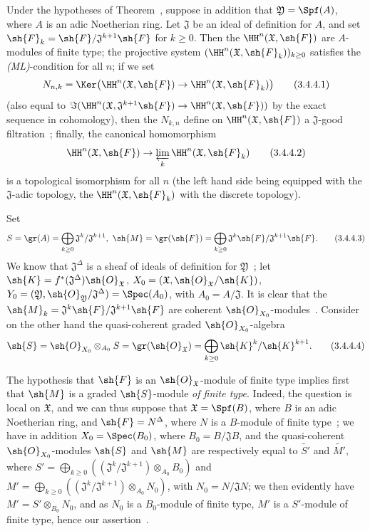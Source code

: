 \begin{corollary}[3.4.4]
\label{III.3.4.4}
Under the hypotheses of Theorem~, suppose in addition that $\mathfrak{Y}=\Spf(A)$, where $A$ is an adic Noetherian ring.
Let $\mathfrak{J}$ be an ideal of definition for $A$, and set $\sh{F}_k=\sh{F}/\mathfrak{J}^{k+1}\sh{F}$ for $k\geq 0$.
Then the $\HH^n(\mathfrak{X},\sh{F})$ are $A$-modules of finite type; the projective system $(\HH^n(\mathfrak{X},\sh{F}_k))_{k\geq 0}$ satisfies the \emph{(ML)}-condition for all $n$; if we set
\[
\label{III.3.4.4.1}
  N_{n,k}=\Ker\big(\HH^n(\mathfrak{X},\sh{F})\to\HH^n(\mathfrak{X},\sh{F}_k)\big)
  \tag{3.4.4.1}
\]
(also equal to $\Im(\HH^n(\mathfrak{X},\mathfrak{J}^{k+1}\sh{F})\to\HH^n(\mathfrak{X},\sh{F}))$ by the exact sequence in cohomology), then the $N_{k,n}$ define on $\HH^n(\mathfrak{X},\sh{F})$ a $\mathfrak{J}$-good filtration~; finally, the canonical homomorphism
\[
\label{III.3.4.4.2}
  \HH^n(\mathfrak{X},\sh{F})\to\varprojlim_k\HH^n(\mathfrak{X},\sh{F}_k)
  \tag{3.4.4.2}
\]
is a topological isomorphism for all $n$ (the left hand side being equipped with the $\mathfrak{J}$-adic topology, the $\HH^n(\mathfrak{X},\sh{F}_k)$ with the discrete topology).
\end{corollary}

Set
\[
\label{III.3.4.4.3}
  S=\gr(A)=\bigoplus_{k\geq 0}\mathfrak{J}^k/\mathfrak{J}^{k+1},\ \sh{M}=\gr(\sh{F})=\bigoplus_{k\geq 0}\mathfrak{J}^k\sh{F}/\mathfrak{J}^{k+1}\sh{F}. \tag{3.4.4.3}
\]
We know that $\mathfrak{J}^\Delta$ is a sheaf of ideals of definition for $\mathfrak{Y}$~; let $\sh{K}=f^*(\mathfrak{J}^\Delta)\sh{O}_\mathfrak{X}$, $X_0=(\mathfrak{X},\sh{O}_\mathfrak{X}/\sh{K})$, $Y_0=(\mathfrak{Y},\sh{O}_\mathfrak{Y}/\mathfrak{J}^\Delta)=\Spec(A_0)$, with $A_0=A/\mathfrak{J}$.
It is clear that the $\sh{M}_k=\mathfrak{J}^k\sh{F}/\mathfrak{J}^{k+1}\sh{F}$ are coherent $\sh{O}_{X_0}$-modules~.
Consider on the other hand the quasi-coherent graded $\sh{O}_{X_0}$-algebra
\[
\label{III.3.4.4.4}
  \sh{S}=\sh{O}_{X_0}\otimes_{A_0}S=\gr(\sh{O}_\mathfrak{X})=\bigoplus_{k\geq 0}\sh{K}^k/\sh{K}^{k+1}.
  \tag{3.4.4.4}
\]

The hypothesis that $\sh{F}$ is an $\sh{O}_\mathfrak{X}$-module of finite type implies first that $\sh{M}$ is
a graded $\sh{S}$-module \emph{of finite type}.
Indeed, the question is local on $\mathfrak{X}$, and we can thus suppose that $\mathfrak{X}=\Spf(B)$, where $B$ is an adic Noetherian ring, and $\sh{F}=N^\Delta$, where $N$ is a $B$-module of finite type~; we have in addition $X_0=\Spec(B_0)$, where $B_0=B/\mathfrak{J}B$, and the quasi-coherent $\sh{O}_{X_0}$-modules $\sh{S}$ and $\sh{M}$ are respectively equal to $\widetilde{S'}$ and $\widetilde{M'}$, where $S'=\bigoplus_{k\geq 0}((\mathfrak{J}^k/\mathfrak{J}^{k+1})\otimes_{A_0}B_0)$ and $M'=\bigoplus_{k\geq 0}((\mathfrak{J}^k/\mathfrak{J}^{k+1})\otimes_{A_0}N_0)$, with $N_0=N/\mathfrak{J}N$; we then evidently have $M'=S'\otimes_{B_0}N_0$, and as $N_0$ is a $B_0$-module of finite type, $M'$ is a $S'$-module of finite type, hence our assertion~.

